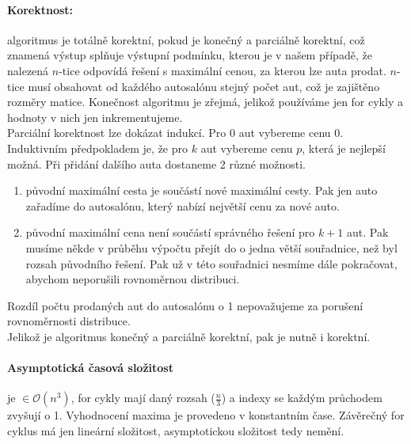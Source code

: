 \documentclass[12pt]{iv003}
\begin{document}
\paragraph{Korektnost:} algoritmus je totálně korektní, pokud je konečný a parciálně korektní, což znamená výstup splňuje výstupní podmínku, kterou je v našem případě, že nalezená $n$-tice odpovídá řešení s maximální cenou, za kterou lze auta prodat. $n$-tice musí obsahovat od každého autosalónu stejný počet aut, což je zajištěno rozměry matice. Konečnost algoritmu je zřejmá, jelikož používáme jen for cykly a hodnoty v nich jen inkrementujeme.\\
Parciální korektnost lze dokázat indukcí. Pro 0 aut vybereme cenu 0. Induktivním předpokladem je, že pro $k$ aut vybereme cenu $p$, která je nejlepší možná. Při přidání dalšího auta dostaneme 2 různé možnosti.\\
\begin{enumerate}
	\item původní maximální cesta je součástí nové maximální cesty. Pak jen auto zařadíme do autosalónu, který nabízí největší cenu za nové auto.
	\item původní maximální cena není součástí správného řešení pro $k+1$ aut. Pak musíme někde v průběhu výpočtu přejít do o jedna větší souřadnice, než byl rozsah původního řešení. Pak už v této souřadnici nesmíme dále pokračovat, abychom neporušili rovnoměrnou distribuci.
\end{enumerate}
Rozdíl počtu prodaných aut do autosalónu o 1 nepovažujeme za porušení rovnoměrnosti distribuce.\\
Jelikož je algoritmus konečný a parciálně korektní, pak je nutně i korektní.
\paragraph{Asymptotická časová složitost} je $\in \mathcal{O}(n^{3})$, for cykly mají daný rozsah ($\frac{n}{3}$) a indexy se každým průchodem zvyšují o 1. Vyhodnocení maxima je provedeno v konstantním čase. Závěrečný for cyklus má jen lineární složitost, asymptotickou složitost tedy nemění.
\end{document}
